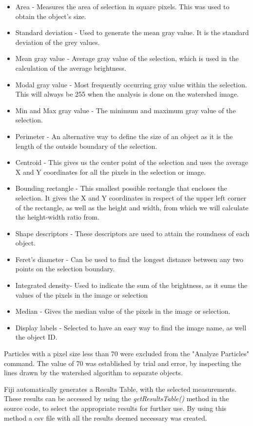 \documentclass[paper=A4,bibliography=totocnumbered]{scrartcl}
\begin{document}
\begin{itemize}
\item Area - Measures the area of selection in square pixels. This was used to obtain the object's size.
\item Standard deviation - Used to generate the mean gray value. It is the standard deviation of the grey values.
\item Mean gray value - Average gray value of the selection, which is used in the calculation of the average brightness.
\item Modal gray value - Most frequently occurring gray value within the selection. This will always be 255 when the analysis is done on the watershed image.
\item Min and Max gray value - The minimum and maximum gray value of the selection.
\item Perimeter - An alternative way to define the size of an object as it is the length of the outside boundary of the selection.
\item Centroid - This gives us the center point of the selection and uses the average X and Y coordinates for all the pixels in the selection or image.
\item Bounding rectangle - This smallest possible rectangle that encloses the selection. It gives the X and Y coordinates in respect of the upper left corner of the rectangle, as well as the height and width, from which we will calculate the height-width ratio from.
\item Shape descriptors - These descriptors are used to attain the roundness of each object.
\item Feret's diameter - Can be used to find the longest distance between any two points on the selection boundary.
\item Integrated density- Used to indicate the sum of the brightness, as it sums the values of the pixels in the image or selection
\item Median - Gives the median value of the pixels in the image or selection.
\item Display labels - Selected to have an easy way to find the image name, as well the object ID.
\end{itemize}

Particles with a pixel size less than 70 were excluded from the "Analyze Particles" command. The value of 70 was established by trial and error, by inspecting the lines drawn by the watershed algorithm to separate objects.

Fiji automatically generates a Results Table, with the selected measurements. These results can be accessed by using the \textit{getResultsTable() }method in the source code, to select the appropriate results for further use. By using this method a csv file with all the results deemed necessary was created. 
\end{document}
